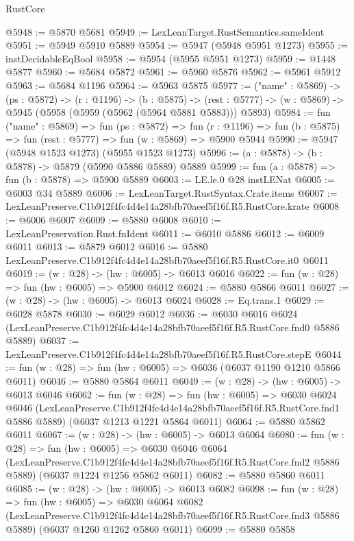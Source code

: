 \begin{lexlean}{RustCore}
\begin{coremodule}
@5948 := @5870 @5681
@5949 := LexLeanTarget.RustSemantics.sameIdent
@5951 := @5949 @5910 @5889
@5954 := @5947 (@5948 @5951 @1273)
@5955 := instDecidableEqBool
@5958 := @5954 (@5955 @5951 @1273)
@5959 := @1448 @5877
@5960 := @5684 @5872
@5961 := @5960 @5876
@5962 := @5961 @5912
@5963 := @5684 @1196
@5964 := @5963 @5875
@5977 := ("name" : @5869) ->
  (ps : @5872) ->
  (r : @1196) ->
  (b : @5875) ->
  (rest : @5777) -> (w : @5869) -> @5945 (@5958 (@5959 (@5962 (@5964 @5881 @5883))) @5893)
@5984 := fun ("name" : @5869) =>
  fun (ps : @5872) =>
  fun (r : @1196) => fun (b : @5875) => fun (rest : @5777) => fun (w : @5869) => @5900 @5944
@5990 := @5947 (@5948 @1523 @1273) (@5955 @1523 @1273)
@5996 := (a : @5878) -> (b : @5878) -> @5879 (@5990 @5886 @5889) @5889
@5999 := fun (a : @5878) => fun (b : @5878) => @5900 @5889
@6003 := LE.le.{0} @28 instLENat
@6005 := @6003 @34 @5889
@6006 := LexLeanTarget.RustSyntax.Crate.items
@6007 := LexLeanPreserve.C1b912f4fc4d4e14a28bfb70aeef5f16f.R5.RustCore.krate
@6008 := @6006 @6007
@6009 := @5880 @6008
@6010 := LexLeanPreservation.Rust.fnIdent
@6011 := @6010 @5886
@6012 := @6009 @6011
@6013 := @5879 @6012
@6016 := @5880 LexLeanPreserve.C1b912f4fc4d4e14a28bfb70aeef5f16f.R5.RustCore.it0 @6011
@6019 := (w : @28) -> (hw : @6005) -> @6013 @6016
@6022 := fun (w : @28) => fun (hw : @6005) => @5900 @6012
@6024 := @5880 @5866 @6011
@6027 := (w : @28) -> (hw : @6005) -> @6013 @6024
@6028 := Eq.trans.{1}
@6029 := @6028 @5878
@6030 := @6029 @6012
@6036 := @6030
    @6016
    @6024
    (LexLeanPreserve.C1b912f4fc4d4e14a28bfb70aeef5f16f.R5.RustCore.fnd0 @5886 @5889)
@6037 := LexLeanPreserve.C1b912f4fc4d4e14a28bfb70aeef5f16f.R5.RustCore.stepE
@6044 := fun (w : @28) => fun (hw : @6005) => @6036 (@6037 @1190 @1210 @5866 @6011)
@6046 := @5880 @5864 @6011
@6049 := (w : @28) -> (hw : @6005) -> @6013 @6046
@6062 := fun (w : @28) =>
  fun (hw : @6005) =>
  @6030
    @6024
    @6046
    (LexLeanPreserve.C1b912f4fc4d4e14a28bfb70aeef5f16f.R5.RustCore.fnd1 @5886 @5889)
    (@6037 @1213 @1221 @5864 @6011)
@6064 := @5880 @5862 @6011
@6067 := (w : @28) -> (hw : @6005) -> @6013 @6064
@6080 := fun (w : @28) =>
  fun (hw : @6005) =>
  @6030
    @6046
    @6064
    (LexLeanPreserve.C1b912f4fc4d4e14a28bfb70aeef5f16f.R5.RustCore.fnd2 @5886 @5889)
    (@6037 @1224 @1256 @5862 @6011)
@6082 := @5880 @5860 @6011
@6085 := (w : @28) -> (hw : @6005) -> @6013 @6082
@6098 := fun (w : @28) =>
  fun (hw : @6005) =>
  @6030
    @6064
    @6082
    (LexLeanPreserve.C1b912f4fc4d4e14a28bfb70aeef5f16f.R5.RustCore.fnd3 @5886 @5889)
    (@6037 @1260 @1262 @5860 @6011)
@6099 := @5880 @5858

\end{coremodule}
\end{lexlean}
